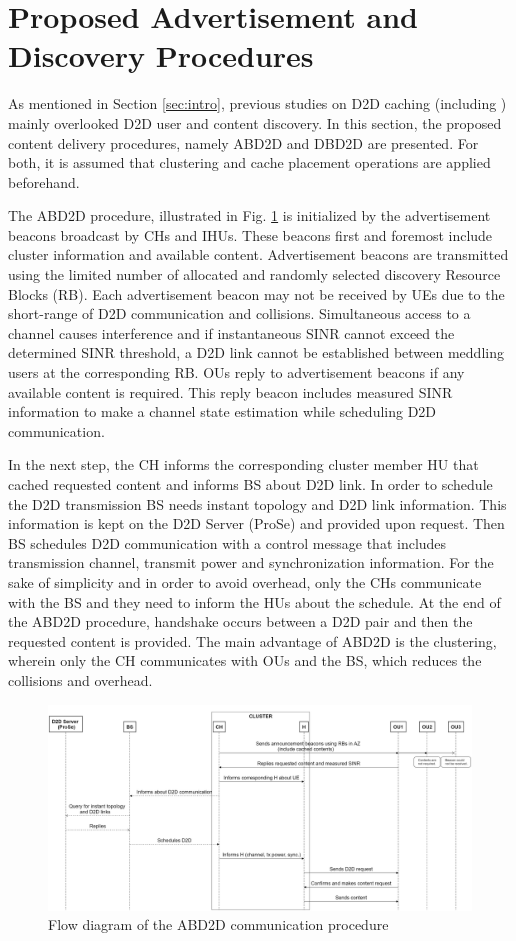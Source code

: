\documentclass[10pt,a4paper,twocolumn]{article}
\begin{document}
\section{Proposed Advertisement and Discovery Procedures}
\label{sec:sec5}

As mentioned in Section  \ref{sec:intro}, previous studies on D2D caching (including \cite{Kazez2019Clustering}) mainly overlooked D2D user and content discovery. In this section, the proposed  content delivery procedures, namely ABD2D and DBD2D are  presented. For both, it is assumed that clustering and cache placement operations are applied beforehand.

The ABD2D procedure, illustrated in Fig. \ref{fig:ABD2D}  is initialized by the advertisement beacons broadcast by CHs and IHUs. These beacons first and foremost include cluster information and available content. Advertisement beacons are transmitted using the limited number of allocated and randomly selected discovery Resource Blocks (RB). Each advertisement beacon may not be received by UEs due to the short-range of D2D communication and collisions. Simultaneous access to a channel causes interference and if instantaneous SINR cannot exceed the determined SINR threshold, a D2D link cannot be established between meddling users at the corresponding RB. OUs reply to advertisement beacons if any available content is required. This reply beacon includes measured SINR information to make a channel state estimation while scheduling D2D communication.

In the next step, the CH informs the corresponding cluster member HU that cached requested content and  informs BS about D2D link. In order to schedule the D2D transmission BS needs instant topology and D2D link information. This information is kept on the D2D Server (ProSe) and provided upon request. Then BS schedules D2D communication with a control message  that includes transmission channel, transmit power and synchronization information. For the sake of simplicity and in order to avoid overhead, only the CHs communicate with the BS and they need to inform the HUs about the schedule. At the end of the ABD2D procedure, handshake occurs between a D2D pair and then the requested content is provided. The main advantage of ABD2D is the clustering, wherein only the CH communicates with OUs and the BS, which reduces the collisions and overhead.

\begin{figure}
	\includegraphics[width=\textwidth]{ABD2D.png}
	\caption{Flow diagram of the ABD2D communication procedure}
	\label{fig:ABD2D}
\end{figure}
\end{document}
